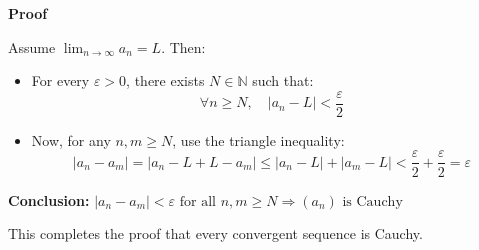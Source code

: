\textbf{Proof}

Assume \( \lim_{n \to \infty} a_n = L \). Then:

\begin{itemize}[label=\(-\)]
    \item For every \( \varepsilon > 0 \), there exists \( N \in \mathbb{N} \) such that:
    \[
    \forall n \ge N, \quad |a_n - L| < \frac{\varepsilon}{2}
    \]

    \item Now, for any \( n, m \ge N \), use the triangle inequality:
    \[
    |a_n - a_m| = |a_n - L + L - a_m| \le |a_n - L| + |a_m - L| < \frac{\varepsilon}{2} + \frac{\varepsilon}{2} = \varepsilon
    \]
\end{itemize}

\textbf{Conclusion:}  
\(
|a_n - a_m| < \varepsilon \text{ for all } n, m \ge N \Rightarrow (a_n) \text{ is Cauchy}
\)

This completes the proof that every convergent sequence is Cauchy.

\QED